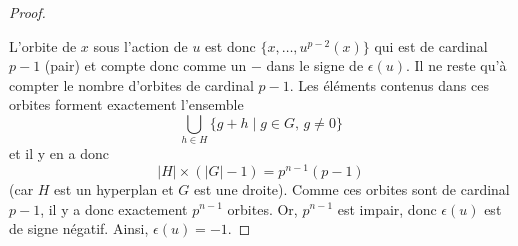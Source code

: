 \begin{proof}
\begin{itemize}
		\end{itemize}
		L'orbite de $x$ sous l'action de $u$ est donc $\{ x, \dots, u^{p-2}(x) \}$ qui est de cardinal $p-1$ (pair) et compte donc comme un $-$ dans le signe de $\epsilon(u)$.
		\newpar
		Il ne reste qu'à compter le nombre d'orbites de cardinal $p-1$. Les éléments contenus dans ces orbites forment exactement l'ensemble
		\[ \bigcup_{h \in H} \{ g + h \mid g \in G, \, g \neq 0 \} \]
		et il y en a donc
		\[ |H| \times (|G|-1) = p^{n-1}(p-1) \]
		(car $H$ est un hyperplan et $G$ est une droite). Comme ces orbites sont de cardinal $p-1$, il y a donc exactement $p^{n-1}$ orbites. Or, $p^{n-1}$ est impair, donc $\epsilon(u)$ est de signe négatif. Ainsi, $\epsilon(u) = -1$.
	\end{proof}

